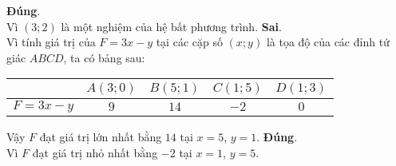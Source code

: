 \begin{ex}
{\begin{itemchoice}
\begin{center}
 \end{center}
	\itemch \textbf{Đúng}. \\Vì  $(3 ; 2)$ là một nghiệm của hệ bất phương trình.			\itemch \textbf{Sai}. \\Vì  tính giá trị của $F=3 x-y$ tại các cặp số $(x ; y)$ là tọa độ của các đỉnh tứ giác $A B C D$, ta có bảng sau: 
	\begin{center}
	\begin{tabular}{|c|c|c|c|c|}
	\hline
	&$A(3 ; 0)$ &$B(5 ; 1)$& $C(1 ; 5)$& $D(1 ; 3)$\\
	\hline
	$F=3 x-y$&$9$ &$14$& $-2$& $0$\\
	\hline
	\end{tabular}
	\end{center}
Vậy $F$ đạt giá trị lớn nhất bằng $14$ tại $x=5$, $ y=1$.
\itemch \textbf{Đúng}.\\ Vì   $F$ đạt giá trị nhỏ nhất bằng $-2$ tại $x=1$, $y=5$.
\end{itemchoice}
}
\end{ex}

